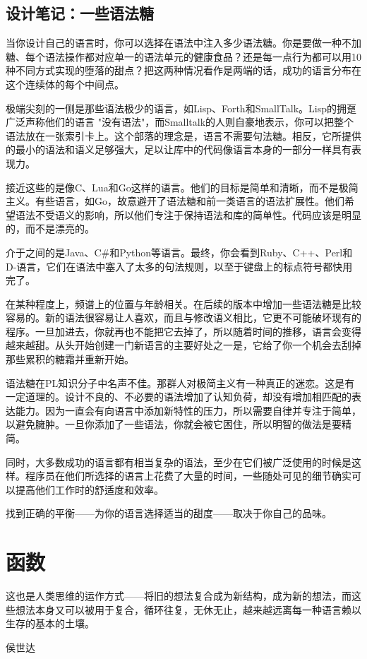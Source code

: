 \documentclass[cn,11pt,chinese]{elegantbook}
\begin{document}
\section{设计笔记：一些语法糖}

当你设计自己的语言时，你可以选择在语法中注入多少语法糖。你是要做一种不加糖、每个语法操作都对应单一的语法单元的健康食品？还是每一点行为都可以用10种不同方式实现的堕落的甜点？把这两种情况看作是两端的话，成功的语言分布在这个连续体的每个中间点。

极端尖刻的一侧是那些语法极少的语言，如Lisp、Forth和SmallTalk。Lisp的拥趸广泛声称他们的语言 "没有语法"，而Smalltalk的人则自豪地表示，你可以把整个语法放在一张索引卡上。这个部落的理念是，语言不需要句法糖。相反，它所提供的最小的语法和语义足够强大，足以让库中的代码像语言本身的一部分一样具有表现力。

接近这些的是像C、Lua和Go这样的语言。他们的目标是简单和清晰，而不是极简主义。有些语言，如Go，故意避开了语法糖和前一类语言的语法扩展性。他们希望语法不受语义的影响，所以他们专注于保持语法和库的简单性。代码应该是明显的，而不是漂亮的。

介于之间的是Java、C\#和Python等语言。最终，你会看到Ruby、C++、Perl和D-语言，它们在语法中塞入了太多的句法规则，以至于键盘上的标点符号都快用完了。

在某种程度上，频谱上的位置与年龄相关。在后续的版本中增加一些语法糖是比较容易的。新的语法很容易让人喜欢，而且与修改语义相比，它更不可能破坏现有的程序。一旦加进去，你就再也不能把它去掉了，所以随着时间的推移，语言会变得越来越甜。从头开始创建一门新语言的主要好处之一是，它给了你一个机会去刮掉那些累积的糖霜并重新开始。

语法糖在PL知识分子中名声不佳。那群人对极简主义有一种真正的迷恋。这是有一定道理的。设计不良的、不必要的语法增加了认知负荷，却没有增加相匹配的表达能力。因为一直会有向语言中添加新特性的压力，所以需要自律并专注于简单，以避免臃肿。一旦你添加了一些语法，你就会被它困住，所以明智的做法是要精简。

同时，大多数成功的语言都有相当复杂的语法，至少在它们被广泛使用的时候是这样。程序员在他们所选择的语言上花费了大量的时间，一些随处可见的细节确实可以提高他们工作时的舒适度和效率。

找到正确的平衡——为你的语言选择适当的甜度——取决于你自己的品味。

\chapter{函数}

\epigraph{这也是人类思维的运作方式——将旧的想法复合成为新结构，成为新的想法，而这些想法本身又可以被用于复合，循环往复，无休无止，越来越远离每一种语言赖以生存的基本的土壤。}{侯世达}
\end{document}
